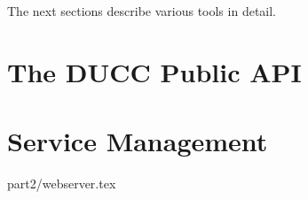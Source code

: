     The next sections describe various tools in detail.    
	    
	
	

\ifpdf
\else
{}
\fi

\chapter{The DUCC Public API}
\label{chap:api}


\ifpdf
\else
{}
\fi
\chapter{Service Management}
\label{chap:services}








 {part2/webserver.tex}

